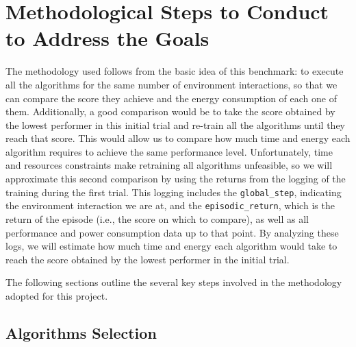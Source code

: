 \section{Methodological Steps to Conduct to Address the Goals}
\label{sec:methodologies}

The methodology used follows from the basic idea of this benchmark: to execute all the algorithms for the same number of environment interactions, so that we can compare the score they achieve and the energy consumption of each one of them. Additionally, a good comparison would be to take the score obtained by the lowest performer in this initial trial and re-train all the algorithms until they reach that score. This would allow us to compare how much time and energy each algorithm requires to achieve the same performance level. Unfortunately, time and resources constraints make retraining all algorithms unfeasible, so we will approximate this second comparison by using the returns from the logging of the training during the first trial. This logging includes the \verb*|global_step|, indicating the environment interaction we are at, and the \verb*|episodic_return|, which is the return of the episode (i.e., the score on which to compare), as well as all performance and power consumption data up to that point. By analyzing these logs, we will estimate how much time and energy each algorithm would take to reach the score obtained by the lowest performer in the initial trial. 

The following sections outline the several key steps involved in the methodology adopted for this project.

\subsection{Algorithms Selection}
\label{subsec:algorithm_selection}
%

